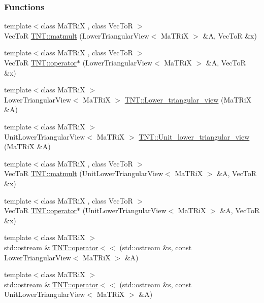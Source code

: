 \subsubsection*{Functions}
\begin{DoxyCompactItemize}
\item 
{\footnotesize template$<$class MaTRiX , class VecToR $>$ }\\VecToR \hyperlink{namespace_t_n_t_abe1cf12459613187ec83a2840af485f5}{TNT::matmult} (LowerTriangularView$<$ MaTRiX $>$ \&A, VecToR \&x)
\item 
{\footnotesize template$<$class MaTRiX , class VecToR $>$ }\\VecToR \hyperlink{namespace_t_n_t_af6106db681ef762d556bfa8799ea63b3}{TNT::operator$\ast$} (LowerTriangularView$<$ MaTRiX $>$ \&A, VecToR \&x)
\item 
{\footnotesize template$<$class MaTRiX $>$ }\\LowerTriangularView$<$ MaTRiX $>$ \hyperlink{namespace_t_n_t_a27a6a03163b1d42f970caa7be7c452d4}{TNT::Lower\_\-triangular\_\-view} (MaTRiX \&A)
\item 
{\footnotesize template$<$class MaTRiX $>$ }\\UnitLowerTriangularView$<$ MaTRiX $>$ \hyperlink{namespace_t_n_t_a8a864cadcadb3df0af49aae3c31042e6}{TNT::Unit\_\-lower\_\-triangular\_\-view} (MaTRiX \&A)
\item 
{\footnotesize template$<$class MaTRiX , class VecToR $>$ }\\VecToR \hyperlink{namespace_t_n_t_af74e1fac28c8406c36b258e55bf5326a}{TNT::matmult} (UnitLowerTriangularView$<$ MaTRiX $>$ \&A, VecToR \&x)
\item 
{\footnotesize template$<$class MaTRiX , class VecToR $>$ }\\VecToR \hyperlink{namespace_t_n_t_aca19c482e86fce8aca0c10df28530ea5}{TNT::operator$\ast$} (UnitLowerTriangularView$<$ MaTRiX $>$ \&A, VecToR \&x)
\item 
{\footnotesize template$<$class MaTRiX $>$ }\\std::ostream \& \hyperlink{namespace_t_n_t_af6633d08f9d920927d0fd3892874d28d}{TNT::operator$<$$<$} (std::ostream \&s, const LowerTriangularView$<$ MaTRiX $>$ \&A)
\item 
{\footnotesize template$<$class MaTRiX $>$ }\\std::ostream \& \hyperlink{namespace_t_n_t_ac779a63cddc53f6fd24af785fd4774af}{TNT::operator$<$$<$} (std::ostream \&s, const UnitLowerTriangularView$<$ MaTRiX $>$ \&A)
\item 

\end{DoxyCompactItemize}
